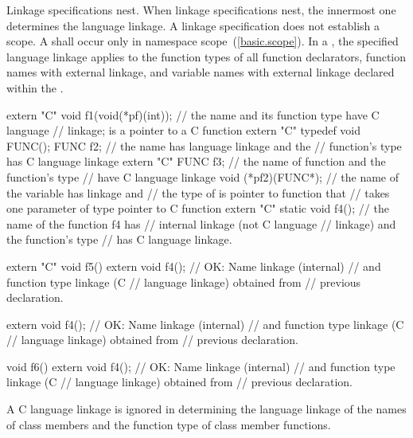 \pnum
{}%
Linkage specifications nest. When linkage specifications nest, the
innermost one determines the language linkage. A linkage specification
does not establish a scope. A  shall
occur only in namespace scope~(\ref{basic.scope}). In a
, the specified language linkage applies
to the function types of all function declarators, function names with
external linkage, and variable names with external linkage declared
within the .
\enterexample

\begin{codeblock}
extern "C" void f1(void(*pf)(int));
                                // the name  and its function type have C language
                                // linkage;  is a pointer to a C function
extern "C" typedef void FUNC();
FUNC f2;                        // the name  has \Cpp language linkage and the
                                // function's type has C language linkage
extern "C" FUNC f3;             // the name of function  and the function's type
                                // have C language linkage
void (*pf2)(FUNC*);             // the name of the variable  has \Cpp linkage and
                                // the type of  is pointer to \Cpp function that
                                // takes one parameter of type pointer to C function
extern "C" {
  static void f4();             // the name of the function f4 has
                                // internal linkage (not C language
                                // linkage) and the function's type
                                // has C language linkage.
}

extern "C" void f5() {
  extern void f4();             // OK: Name linkage (internal)
                                // and function type linkage (C
                                // language linkage) obtained from
                                // previous declaration.
}

extern void f4();               // OK: Name linkage (internal)
                                // and function type linkage (C
                                // language linkage) obtained from
                                // previous declaration.

void f6() {
  extern void f4();             // OK: Name linkage (internal)
                                // and function type linkage (C
                                // language linkage) obtained from
                                // previous declaration.
}
\end{codeblock}
\exitexample
{}%
A C language linkage is ignored
in determining the language linkage of
the names of class members and the
function type of class member functions.
\enterexample

